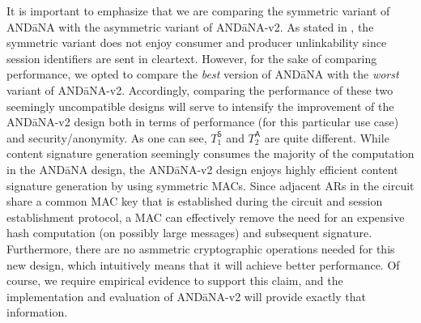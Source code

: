 \documentclass[10pt]{article}
\begin{document}
It is important to emphasize that we are comparing the symmetric variant of {\sf AND\=aNA} with the asymmetric variant of {\sf AND\=aNA-v2}. As stated in \cite{andana}, the symmetric variant does not enjoy consumer and producer unlinkability since session identifiers are sent in cleartext. However, for the sake of comparing performance, we opted to compare the \emph{best} version of {\sf AND\=aNA} with the \emph{worst} variant of {\sf AND\=aNA-v2}. Accordingly, comparing the performance of these two seemingly uncompatible designs will serve to intensify the improvement of the {\sf AND\=aNA-v2} design both in terms of performance (for this particular use case) and security/anonymity. 
As one can see, $T_1^{\mathsf{S}}$ and $T_2^{\mathsf{A}}$ are quite different. While content signature generation seemingly consumes the majority of the computation in the {\sf AND\=aNA} design, the {\sf AND\=aNA-v2} design enjoys highly efficient content signature generation by using symmetric MACs. Since adjacent ARs in the circuit share a common MAC key that is established during the circuit and session establishment protocol, a MAC can effectively remove the need for an expensive hash computation (on possibly large messages) and subsequent signature. Furthermore, there are no asmmetric cryptographic operations needed for this new design, which intuitively means that it will achieve better performance. Of course, we require empirical evidence to support this claim, and the implementation and evaluation of {\sf AND\=aNA-v2} will provide exactly that information.


\end{document}
